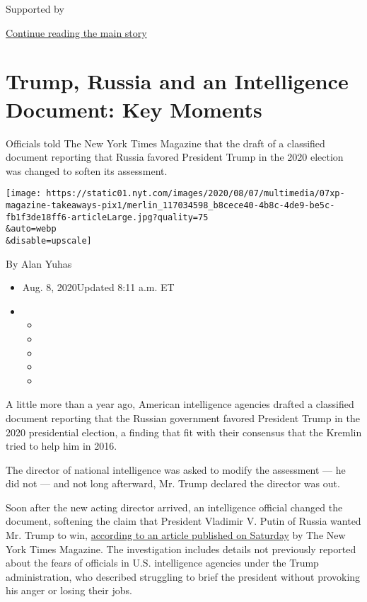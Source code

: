 Supported by

\protect\hyperlink{after-sponsor}{Continue reading the main story}

\hypertarget{trump-russia-and-an-intelligence-document-key-moments}{%
\section{Trump, Russia and an Intelligence Document: Key
Moments}\label{trump-russia-and-an-intelligence-document-key-moments}}

Officials told The New York Times Magazine that the draft of a
classified document reporting that Russia favored President Trump in the
2020 election was changed to soften its assessment.

\texttt{[image: https://static01.nyt.com/images/2020/08/07/multimedia/07xp-magazine-takeaways-pix1/merlin\_117034598\_b8cece40-4b8c-4de9-be5c-fb1f3de18ff6-articleLarge.jpg?quality=75\\\&auto=webp\\\&disable=upscale]}

By Alan Yuhas

\begin{itemize}
\item
  Aug. 8, 2020Updated 8:11 a.m. ET
\item
  \begin{itemize}
  \item
  \item
  \item
  \item
  \item
  \end{itemize}
\end{itemize}

A little more than a year ago, American intelligence agencies drafted a
classified document reporting that the Russian government favored
President Trump in the 2020 presidential election, a finding that fit
with their consensus that the Kremlin tried to help him in 2016.

The director of national intelligence was asked to modify the assessment
--- he did not --- and not long afterward, Mr. Trump declared the
director was out.

Soon after the new acting director arrived, an intelligence official
changed the document, softening the claim that President Vladimir V.
Putin of Russia wanted Mr. Trump to win,
\href{https://www.nytimes.com/2020/08/08/magazine/us-russia-intelligence.html?}{according
to an article published on Saturday} by The New York Times Magazine. The
investigation includes details not previously reported about the fears
of officials in U.S. intelligence agencies under the Trump
administration, who described struggling to brief the president without
provoking his anger or losing their jobs.

